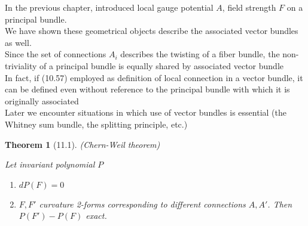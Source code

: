 \documentclass{book}
\newtheorem{theorem}{Theorem}
\begin{document}
In the previous chapter, introduced local gauge potential $A$, field strength $F$ on a principal bundle.  \\
\quad We have shown these geometrical objects describe the associated vector bundles as well. \\
\quad Since the set of connections $A_i$ describes the twisting of a fiber bundle, the non-triviality of a principal bundle is equally shared by associated vector bundle \\
\quad \quad In fact, if (10.57) employed as definition of local connection in a vector bundle, it can be defined even without reference to the principal bundle with which it is originally associated \\
Later we encounter situations in which use of vector bundles is essential (the Whitney sum bundle, the splitting principle, etc.)

\begin{theorem}[11.1] (Chern-Weil theorem)

Let invariant polynomial $P$

\begin{enumerate}
\item[(a)] $dP(F) = 0$ 
\item[(b)] $F,F'$ curvature 2-forms corresponding to different connections $A, A'$.  Then $P(F')- P(F)$ exact.
\end{enumerate}
\end{theorem}
\end{document}
